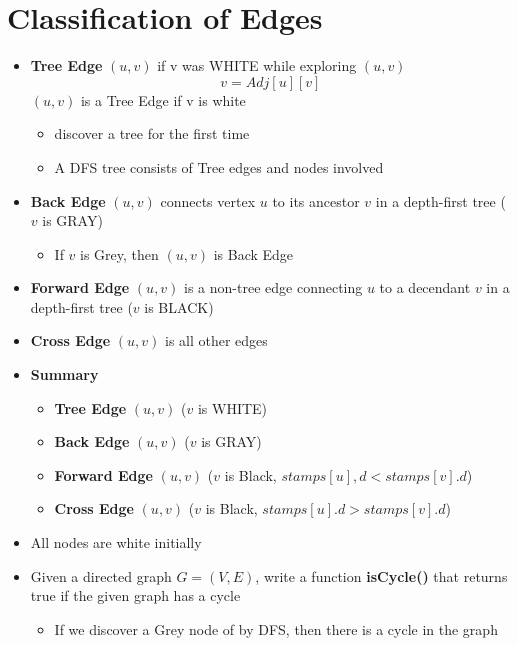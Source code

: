 \documentclass[12pt, letterpaper]{article}
\begin{document}
\section{Classification of Edges}
\begin{itemize}
  \item \textbf{Tree Edge} $(u, v)$ if v was WHITE while exploring $(u, v)$
  \begin{equation*}
    v=Adj[u][v]
  \end{equation*}
  $(u, v)$ is a Tree Edge if v is white
  \begin{itemize}
    \item discover a tree for the first time
    \item A DFS tree consists of Tree edges and nodes involved
  \end{itemize}
  \item \textbf{Back Edge} $(u, v)$ connects vertex $u$ to its ancestor $v$ in a depth-first tree ($v$ is GRAY)
  \begin{itemize}
    \item If $v$ is Grey, then $(u, v)$ is Back Edge
  \end{itemize}
  \item \textbf{Forward Edge} $(u, v)$ is a non-tree edge connecting $u$ to a decendant $v$ in a depth-first tree ($v$ is BLACK)
  \item \textbf{Cross Edge} $(u, v)$ is all other edges
  \item \textbf{Summary}
  \begin{itemize}
    \item \textbf{Tree Edge} $(u, v)$ ($v$ is WHITE)
    \item \textbf{Back Edge} $(u, v)$ ($v$ is GRAY)
    \item \textbf{Forward Edge} $(u, v)$ ($v$ is Black, $stamps[u],d<stamps[v].d$)
    \item \textbf{Cross Edge} $(u, v)$ ($v$ is Black, $stamps[u].d>stamps[v].d$)
  \end{itemize}
  \item All nodes are white initially
  \item Given a directed graph $G=(V, E)$, write a function \textbf{isCycle()} that returns true if the given graph has a cycle
  \begin{itemize}
    \item If we discover a Grey node of by DFS, then there is a cycle in the graph
  \end{itemize}
\end{itemize}
\end{document}
